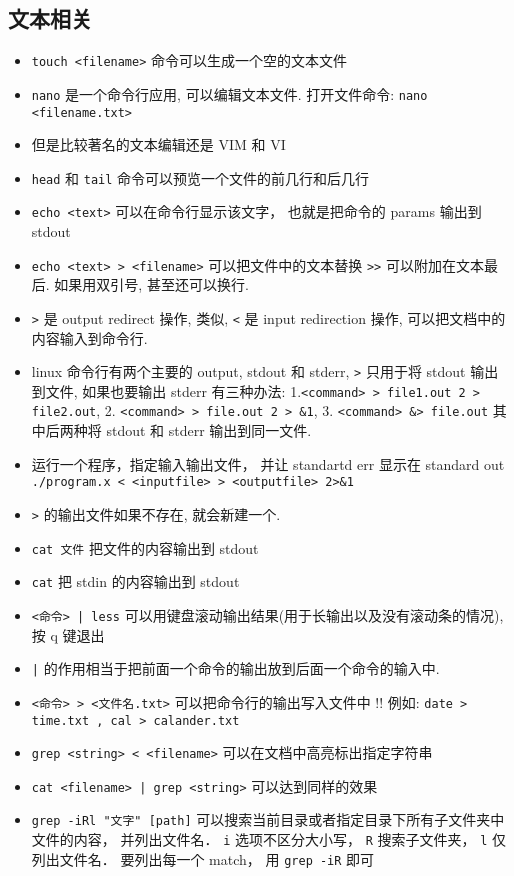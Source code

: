 \subsection{文本相关}
\begin{itemize}
\item \verb`touch <filename>` 命令可以生成一个空的文本文件
\item \verb`nano` 是一个命令行应用, 可以编辑文本文件. 打开文件命令: \verb`nano <filename.txt>`
\item 但是比较著名的文本编辑还是 VIM 和 VI 
\item \verb`head` 和 \verb`tail` 命令可以预览一个文件的前几行和后几行
\item \verb`echo <text>` 可以在命令行显示该文字， 也就是把命令的 params 输出到 stdout
\item \verb`echo <text> > <filename>` 可以把文件中的文本替换 \verb`>>` 可以附加在文本最后. 如果用双引号, 甚至还可以换行.
\item \verb`>` 是 output redirect 操作, 类似, \verb`<` 是 input redirection 操作, 可以把文档中的内容输入到命令行.
\item linux 命令行有两个主要的 output, stdout 和 stderr, \verb`>` 只用于将 stdout 输出到文件, 如果也要输出 stderr 有三种办法: 1.\verb`<command> > file1.out 2 > file2.out`, 2. \verb`<command> > file.out 2 > &1`, 3. \verb`<command> &> file.out` 其中后两种将 stdout 和 stderr 输出到同一文件.
\item 运行一个程序，指定输入输出文件， 并让 standartd err 显示在 standard out \verb`./program.x < <inputfile> > <outputfile> 2>&1` 
\item \verb`>` 的输出文件如果不存在, 就会新建一个.
\item  \verb`cat 文件` 把文件的内容输出到 stdout
\item  \verb`cat` 把 stdin 的内容输出到 stdout
\item \verb`<命令> | less` 可以用键盘滚动输出结果(用于长输出以及没有滚动条的情况), 按 q 键退出
\item \verb`|` 的作用相当于把前面一个命令的输出放到后面一个命令的输入中.
\item \verb`<命令> > <文件名.txt>` 可以把命令行的输出写入文件中 !! 例如: \verb`date > time.txt , cal > calander.txt`
\item \verb`grep <string> < <filename>` 可以在文档中高亮标出指定字符串
\item \verb`cat <filename> | grep <string>` 可以达到同样的效果
\item \verb`grep -iRl "文字" [path]` 可以搜索当前目录或者指定目录下所有子文件夹中文件的内容， 并列出文件名． \verb`i` 选项不区分大小写， \verb`R` 搜索子文件夹， \verb`l` 仅列出文件名． 要列出每一个 match， 用 \verb`grep -iR` 即可

\end{itemize}
